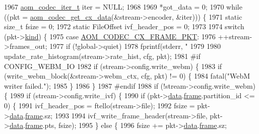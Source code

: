\begin{DoxyCodeInclude}
{{{{{{{{{{{{{{{{{{{{{{{{{{{{{{{{{{{{{1967   \hyperlink{group__codec_gadf9e173c9e02788a9999399edab20a02}{aom\_codec\_iter\_t} iter = NULL;
1968 
1969   *got\_data = 0;
1970   \textcolor{keywordflow}{while} ((pkt = \hyperlink{group__encoder_gaedc4c56b60d4217677cb561066360884}{aom\_codec\_get\_cx\_data}(&stream->encoder, &iter))) \{
1971     \textcolor{keyword}{static} \textcolor{keywordtype}{size\_t} fsize = 0;
1972     \textcolor{keyword}{static} FileOffset ivf\_header\_pos = 0;
1973 
1974     \textcolor{keywordflow}{switch} (pkt->\hyperlink{structaom__codec__cx__pkt_a11e586120c689ece9a7690e72ff384be}{kind}) \{
1975       \textcolor{keywordflow}{case} \hyperlink{group__encoder_ggafeb69da4a9649a54e805f59c26d8dfeda793165d0f219812342f69d5fd9b2b9c8}{AOM\_CODEC\_CX\_FRAME\_PKT}:
1976         ++stream->frames\_out;
1977         \textcolor{keywordflow}{if} (!global->quiet)
1978           fprintf(stderr, \textcolor{stringliteral}{" %
1979 
1980         update\_rate\_histogram(stream->rate\_hist, cfg, pkt);
1981 \textcolor{preprocessor}{#if CONFIG\_WEBM\_IO}
1982         \textcolor{keywordflow}{if} (stream->config.write\_webm) \{
1983           \textcolor{keywordflow}{if} (write\_webm\_block(&stream->webm\_ctx, cfg, pkt) != 0) \{
1984             fatal(\textcolor{stringliteral}{"WebM writer failed."});
1985           \}
1986         \}
1987 \textcolor{preprocessor}{#endif}
1988         \textcolor{keywordflow}{if} (!stream->config.write\_webm) \{
1989           \textcolor{keywordflow}{if} (stream->config.write\_ivf) \{
1990             \textcolor{keywordflow}{if} (pkt->\hyperlink{structaom__codec__cx__pkt_afb379cd4bfa7692d1d6e85f4e4b2b410}{data}.\hyperlink{structaom__codec__cx__pkt_a4180a6ae59b0d295bc915d4689df4cb0}{frame}.partition\_id <= 0) \{
1991               ivf\_header\_pos = ftello(stream->file);
1992               fsize = pkt->\hyperlink{structaom__codec__cx__pkt_afb379cd4bfa7692d1d6e85f4e4b2b410}{data}.\hyperlink{structaom__codec__cx__pkt_a4180a6ae59b0d295bc915d4689df4cb0}{frame}.sz;
1993 
1994               ivf\_write\_frame\_header(stream->file, pkt->\hyperlink{structaom__codec__cx__pkt_afb379cd4bfa7692d1d6e85f4e4b2b410}{data}.\hyperlink{structaom__codec__cx__pkt_a4180a6ae59b0d295bc915d4689df4cb0}{frame}.pts, fsize);
1995             \} \textcolor{keywordflow}{else} \{
1996               fsize += pkt->\hyperlink{structaom__codec__cx__pkt_afb379cd4bfa7692d1d6e85f4e4b2b410}{data}.\hyperlink{structaom__codec__cx__pkt_a4180a6ae59b0d295bc915d4689df4cb0}{frame}.sz;
}}}}}}}}}}}}}}}}}}}}}}}}}}}}}}}}}}}}}}
\end{DoxyCodeInclude}
